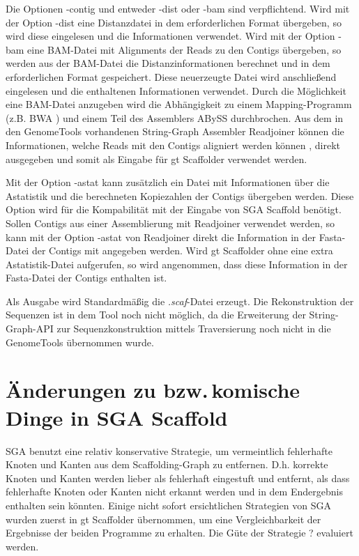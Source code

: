 \documentclass[a4paper,10pt,parskip]{scrartcl}
\begin{document}
Die Optionen -contig und entweder -dist oder -bam sind
verpflichtend. Wird mit der Option -dist eine Distanzdatei in dem
erforderlichen Format übergeben, so wird diese eingelesen und die
Informationen verwendet. Wird mit der Option -bam eine BAM-Datei mit
Alignments der Reads zu den Contigs übergeben, so werden aus der
BAM-Datei die Distanzinformationen berechnet und in dem erforderlichen
Format gespeichert. Diese neuerzeugte Datei wird anschließend
eingelesen und die enthaltenen Informationen verwendet. Durch die
Möglichkeit eine BAM-Datei anzugeben wird die Abhängigkeit zu einem
Mapping-Programm (z.B. BWA \cite{BWA}) und einem Teil des
Assemblers ABySS \cite{abyss} durchbrochen. Aus dem in den
GenomeTools vorhandenen String-Graph Assembler Readjoiner können die
Informationen, welche Reads mit den Contigs aligniert werden können ,
direkt ausgegeben und somit als Eingabe für gt Scaffolder verwendet
werden.

Mit der Option -astat kann zusätzlich ein Datei mit Informationen über
die Astatistik und die berechneten Kopiezahlen der Contigs übergeben
werden. Diese Option wird für die Kompabilität mit der Eingabe von SGA
Scaffold benötigt. Sollen Contigs aus einer Assemblierung mit
Readjoiner verwendet werden, so kann mit der Option -astat von
Readjoiner direkt die Information in der Fasta-Datei der Contigs mit
angegeben werden. Wird gt Scaffolder ohne eine extra Astatistik-Datei
aufgerufen, so wird angenommen, dass diese Information in der
Fasta-Datei der Contigs enthalten ist.

Als Ausgabe wird Standardmäßig die \textit{.scaf}-Datei
erzeugt. Die Rekonstruktion der Sequenzen ist in dem Tool noch nicht
möglich, da die Erweiterung der String-Graph-API zur
Sequenzkonstruktion mittels Traversierung noch nicht in die
GenomeTools übernommen wurde.

\section{Änderungen zu bzw.\,komische Dinge in SGA Scaffold}

SGA benutzt eine relativ konservative Strategie, um vermeintlich
fehlerhafte Knoten und Kanten aus dem Scaffolding-Graph zu
entfernen. D.h. korrekte Knoten und Kanten werden lieber als
fehlerhaft eingestuft und entfernt, als dass fehlerhafte Knoten oder
Kanten nicht erkannt werden und in dem Endergebnis enthalten sein
könnten. Einige nicht sofort ersichtlichen Strategien von SGA wurden
zuerst in gt Scaffolder übernommen, um eine Vergleichbarkeit der
Ergebnisse der beiden Programme zu erhalten. Die Güte der Strategie
? evaluiert werden.
\end{document}
